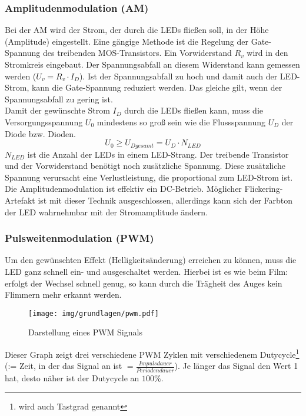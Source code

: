 \subsubsection{Amplitudenmodulation (AM)}
Bei der AM wird der Strom, der durch die LEDs fließen soll, in der Höhe (Amplitude) eingestellt. Eine gängige Methode ist die Regelung der Gate-Spannung des treibenden MOS-Transistors. Ein Vorwiderstand $ R_v $ wird in den Stromkreis eingebaut. Der Spannungsabfall an diesem Widerstand kann gemessen werden ($ U_v=R_v \cdot I_D $). Ist der Spannungsabfall zu hoch und damit auch der LED-Strom, kann die Gate-Spannung reduziert werden. Das gleiche gilt, wenn der Spannungsabfall zu gering ist. \\
Damit der gewünschte Strom $ I_D $ durch die LEDs fließen kann, muss die Versorgungsspannung $ U_0 $ mindestens so groß sein wie die Flussspannung $ U_D $ der Diode bzw. Dioden.
\begin{equation}
U_{0} \geq U_{Dgesamt}=U_{D}\cdot N_{LED}
\end{equation}
$ N_{LED} $ ist die Anzahl der LEDs in einem LED-Strang. Der treibende Transistor und der Vorwiderstand benötigt noch zusätzliche Spannung. Diese zusätzliche Spannung verursacht eine Verlustleistung, die proportional zum LED-Strom ist.\\
Die Amplitudenmodulation ist effektiv ein DC-Betrieb. Möglicher Flickering-Artefakt ist mit dieser Technik ausgeschlossen, allerdings kann sich der Farbton der LED wahrnehmbar mit der Stromamplitude ändern.

\subsubsection{Pulsweitenmodulation (PWM)}
Um den gewünschten Effekt (Helligkeitsänderung) erreichen zu können, muss die LED ganz schnell ein- und ausgeschaltet werden. Hierbei ist es wie beim Film: erfolgt der Wechsel schnell genug, so kann durch die Trägheit des Auges kein Flimmern mehr erkannt werden. 

\begin{figure}[H]
	\centering
	\texttt{[image: img/grundlagen/pwm.pdf]}
	\caption{Darstellung eines PWM Signals}
	\label{fig:pwm_graph}
\end{figure}

Dieser Graph zeigt drei verschiedene PWM Zyklen mit verschiedenem Dutycycle\footnote{wird auch Tastgrad genannt} (:= Zeit, in der das Signal an ist $ = \tfrac{Impulsdauer}{Periodendauer}$). Je länger das Signal den Wert 1 hat, desto näher ist der Dutycycle an $100\%$.\\


